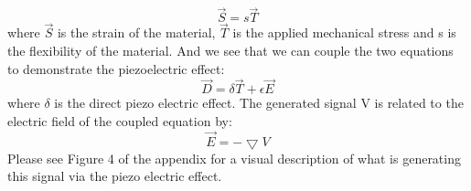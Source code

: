 \documentclass{article}
\begin{document}
    \begin{equation}
        \vec{S} = s \vec{T}
    \end{equation}
    where $\vec{S}$ is the strain of the material, $\vec{T}$ is the applied mechanical stress and s is the flexibility of the material. And we see that we can couple the two equations to demonstrate the piezoelectric effect: 
    \begin{equation}
        \vec{D} = \delta \vec{T} + \epsilon \vec{E}
    \end{equation} 
    where $\delta$ is the direct piezo electric effect. The generated signal V is related to the electric field of the coupled equation by:
    \begin{equation}
        \vec{E} = -\bigtriangledown V
    \end{equation}
    Please see Figure 4 of the appendix for a visual description of what is generating this signal via the piezo electric effect. \cite{wiki2}
    \cite{piezo1}
\end{document}
